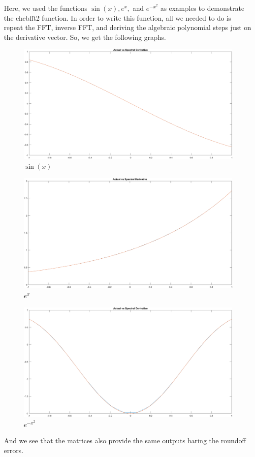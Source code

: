 \documentclass[12pt]{article}
\begin{document}
Here, we used the functions $\sin(x), e^x,$ and $e^{-x^2}$ as examples to demonstrate the chebfft2 function. In order to write this function, all we needed to do is repeat the FFT, inverse FFT, and deriving the algebraic polynomial steps just on the derivative vector. So, we get the following graphs.\\

\begin{figure}[htp]
\centering
\includegraphics[scale=0.10]{8_5sin.PNG}
\caption{$\sin(x)$}
\end{figure}
\begin{figure}[htp]
\centering
\includegraphics[scale=0.10]{8_5exp.PNG}
\caption{$e^x$}
\end{figure}
\begin{figure}[htp]
\centering
\includegraphics[scale=0.10]{8_5expx2.PNG}
\caption{$e^{-x^2}$}
\end{figure}

And we see that the matrices also provide the same outputs baring the roundoff errors.

\newpage

\end{document}
